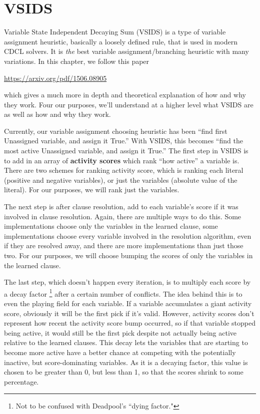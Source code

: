 \documentclass[oneside]{book}
\begin{document}
\section{VSIDS}

Variable State Independent Decaying Sum (VSIDS) is a type of variable assignment 
heuristic, basically a loosely defined rule, that is used in modern CDCL solvers.
It is \textit{the} best variable assignment/branching heuristic with many variations.
In this chapter, we follow this paper
\begin{center}
    \url{https://arxiv.org/pdf/1506.08905}
\end{center}
which gives a much more in depth and theoretical explanation of how and why they work.
Four our purposes, we'll understand at a higher level what VSIDS are as well as how 
and why they work. 

Currently, our variable assignment choosing heuristic has been ``find first Unassigned
variable, and assign it True.'' With VSIDS, this becomes ``find the most active Unassigned
variable, and assign it True.'' The first step in VSIDS is to add in an array of
\textbf{activity scores} which rank ``how active'' a variable is. There are two schemes 
for ranking activity score, which is ranking each literal (positive and negative variables),
or just the variables (absolute value of the literal). For our purposes, we will rank just 
the variables. 

The next step is after clause resolution, add to each variable's score if it was involved 
in clause resolution. Again, there are multiple ways to do this. Some implementations choose 
only the variables in the learned clause, some implementations choose every variable involved 
in the resolution algorithm, even if they are resolved away, and there are more implementations 
than just those two. For our purposes, we will choose bumping the scores of only the variables 
in the learned clause.

The last step, which doesn't happen every iteration, is to multiply each score by a decay factor 
\footnote{Not to be confused with Deadpool's ``dying factor."}
after a certain number of conflicts. The idea behind this is to even the playing field for 
each variable. If a variable accumulates a giant activity score, obviously it will be the first 
pick if it's valid. However, activity scores don't represent how recent the activity score bump 
occurred, so if that variable stopped being active, it would still be the first pick despite 
not actually being active relative to the learned clauses. This decay lets the variables that 
are starting to become more active have a better chance at competing with the potentially 
inactive, but score-dominating variables. As it is a decaying factor, this value is chosen 
to be greater than 0, but less than 1, so that the scores shrink to some percentage.
\end{document}
